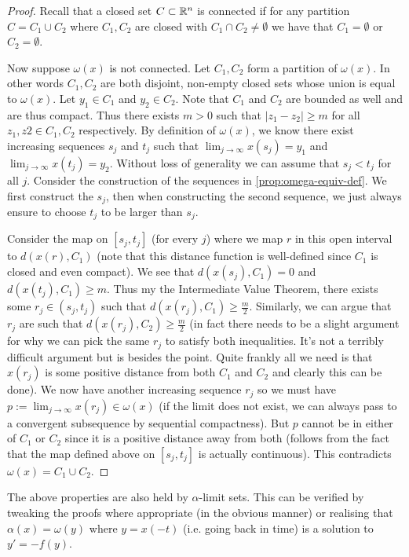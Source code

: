 \begin{proof}
Recall that a closed set $C \subset \mathbb{R}^n$ is connected if for any partition $C = C_1 \cup C_2$ where $C_1, C_2$ are closed with $C_1 \cap C_2 \neq \emptyset$ we have that $C_1 = \emptyset$ or $C_2 = \emptyset$.

Now suppose $\omega(x)$ is not connected. Let $C_1, C_2$ form a partition of $\omega(x)$. In other words $C_1, C_2$ are both disjoint, non-empty closed sets whose union is equal to $\omega(x)$. Let $y_1 \in C_1$ and $y_2 \in C_2$. Note that $C_1$ and $C_2$ are bounded as well and are thus compact. Thus there exists $m > 0$ such that $\left| z_1 - z_2 \right| \geq m$ for all $z_1, z2 \in C_1, C_2$ respectively. By definition of $\omega(x)$, we know there exist increasing sequences $s_j$ and $t_j$ such that $\lim_{j \to \infty} x(s_j) = y_1$ and $\lim_{j \to \infty} x(t_j) = y_2$.  Without loss of generality we can assume that $s_j < t_j$ for all $j$. Consider the construction of the sequences in \autoref{prop:omega-equiv-def}. We first construct the $s_j$, then when constructing the second sequence, we just always ensure to choose $t_j$ to be larger than $s_j$.

Consider the map on $[s_j, t_j]$ (for every $j$) where we map $r$ in this open interval to $d(x(r), C_1)$ (note that this distance function is well-defined since $C_1$ is closed and even compact). We see that $d(x(s_j), C_1) = 0$ and $d(x(t_j), C_1) \geq m$. Thus my the Intermediate Value Theorem, there exists some $r_j \in (s_j, t_j)$ such that $d(x(r_j), C_1) \geq \frac{m}{2}$. Similarly, we can argue that $r_j$ are such that $d(x(r_j), C_2) \geq \frac{m}{2}$ (in fact there needs to be a slight argument for why we can pick the same $r_j$ to satisfy both inequalities. It's not a terribly difficult argument but is besides the point. Quite frankly all we need is that $x(r_j)$ is some positive distance from both $C_1$ and $C_2$ and clearly this can be done). We now have another increasing sequence $r_j$ so we must have $p := \lim_{j \to \infty} x(r_j) \in \omega(x)$ (if the limit does not exist, we can always pass to a convergent subsequence by sequential compactness). But $p$ cannot be in either of $C_1$ or $C_2$ since it is a positive distance away from both (follows from the fact that the map defined above on $[s_j, t_j]$ is actually continuous). This contradicts $\omega(x) = C_1 \cup C_2$.
\end{proof}
\begin{remark}
The above properties are also held by $\alpha$-limit sets. This can be verified by tweaking the proofs where appropriate (in the obvious manner) or realising that $\alpha(x) = \omega(y)$ where $y = x(-t)$ (i.e. going back in time) is a solution to $y' = -f(y)$.
\end{remark}

